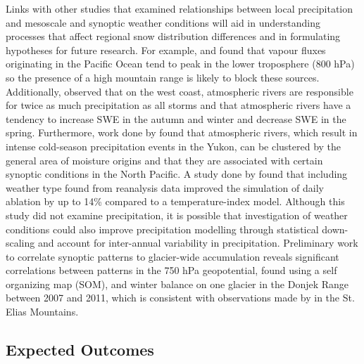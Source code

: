 \documentclass[12pt]{article}
\begin{document}
Links with other studies that examined relationships between local precipitation and mesoscale and synoptic weather conditions will aid in understanding processes that affect regional snow distribution differences and in formulating hypotheses for future research. For example, \cite{Serreze1995} and \cite{Lackmann1998} found that vapour fluxes originating in the Pacific Ocean tend to peak in the lower troposphere (800 hPa) so the presence of a high mountain range is likely to block these sources. Additionally, \cite{Neiman2008} observed that on the west coast, atmospheric rivers are responsible for twice as much precipitation as all storms and that atmospheric rivers have a tendency to increase SWE in the autumn and winter and decrease SWE in the spring. Furthermore, work done by \cite{Roberge2009} found that atmospheric rivers, which result in intense cold-season precipitation events in the Yukon, can be clustered by the general area of moisture origins and that they are associated with certain synoptic conditions in the North Pacific. A study done by \cite{Matthews2013} found that including weather type found from reanalysis data improved the simulation of daily ablation by up to 14\% compared to a temperature-index model. Although this study did not examine precipitation, it is possible that investigation of weather conditions could also improve precipitation modelling through statistical down-scaling and account for inter-annual variability in precipitation. Preliminary work to correlate synoptic patterns to glacier-wide accumulation reveals significant correlations between patterns in the 750 hPa geopotential, found using a self organizing map (SOM), and winter balance on one glacier in the Donjek Range between 2007 and 2011, which is consistent with observations made by \cite{Taylor1969} in the St. Elias Mountains. 

\subsection{Expected Outcomes}
\end{document}
